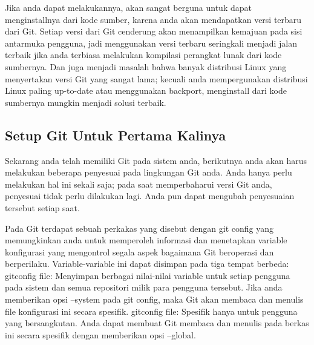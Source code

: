 {{\vspace{\baselineskip}
\noindent 
{\fontsize{14pt}{14pt}\selectfont Jika anda dapat melakukannya, akan sangat berguna untuk dapat menginstallnya dari kode sumber, karena anda akan mendapatkan versi terbaru dari Git. Setiap versi dari Git cenderung akan menampilkan kemajuan pada sisi antarmuka pengguna, jadi menggunakan versi terbaru seringkali menjadi jalan terbaik jika anda terbiasa melakukan kompilasi perangkat lunak dari kode sumbernya. Dan juga menjadi masalah bahwa banyak distribusi Linux yang menyertakan versi Git yang sangat lama; kecuali anda mempergunakan distribusi Linux paling up-to-date atau menggunakan backport, menginstall dari kode sumbernya mungkin menjadi solusi terbaik. \\} \par

\vspace{\baselineskip}
\vspace{14pt}
\noindent 
{\fontsize{14pt}{14pt}\subsection {Setup Git Untuk Pertama Kalinya}
	\vspace{\baselineskip}
\noindent 
{\fontsize{14pt}{14pt}\selectfont Sekarang anda telah memiliki Git pada sistem anda, berikutnya anda akan harus melakukan beberapa penyesuai pada lingkungan Git anda. Anda hanya perlu melakukan hal ini sekali saja; pada saat memperbaharui versi Git anda, penyesuai tidak perlu dilakukan lagi. Anda pun dapat mengubah penyesuaian tersebut setiap saat. \\} \par

\vspace{\baselineskip}
\noindent 
{\fontsize{14pt}{14pt}\selectfont Pada Git terdapat sebuah perkakas yang disebut dengan git config yang memungkinkan anda untuk memperoleh informasi dan menetapkan variable konfigurasi yang mengontrol segala aspek bagaimana Git beroperasi dan berperilaku. Variable-variable ini dapat disimpan pada tiga tempat berbeda: gitconfig $  $file: Menyimpan berbagai nilai-nilai variable untuk setiap pengguna pada sistem dan semua repositori milik para pengguna tersebut. Jika anda memberikan opsi $  $--system $  $pada $  $git config, maka Git akan membaca dan menulis file konfigurasi ini secara spesifik. gitconfig $  $file: Spesifik hanya untuk pengguna yang bersangkutan. Anda dapat membuat Git membaca dan menulis pada berkas ini secara spesifik dengan memberikan opsi $  $--global. \\} \par

}}}
